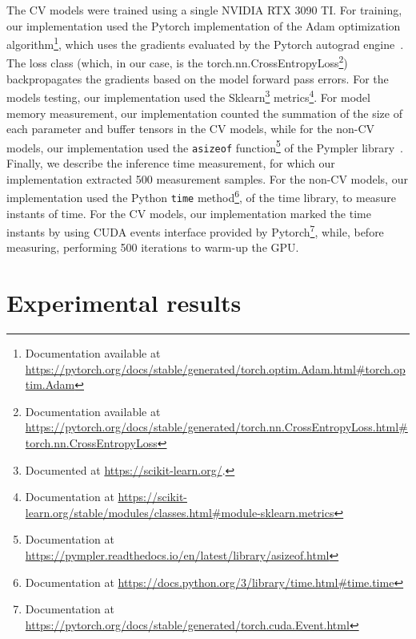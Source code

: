 The \gls{CV} models were trained using a single NVIDIA RTX 3090 TI. For training, our implementation used the Pytorch implementation of the Adam optimization algorithm\footnote{Documentation available at \url{https://pytorch.org/docs/stable/generated/torch.optim.Adam.html\#torch.optim.Adam}}, which uses the gradients evaluated by the Pytorch autograd engine~\cite{Pytorch}. The loss class (which, in our case, is the torch.nn.CrossEntropyLoss\footnote{Documentation available at \url{https://pytorch.org/docs/stable/generated/torch.nn.CrossEntropyLoss.html\#torch.nn.CrossEntropyLoss}}) backpropagates the gradients based on the model forward pass errors. For the models testing, our implementation used the Sklearn\footnote{Documented at \url{https://scikit-learn.org/}.} metrics\footnote{Documentation at \url{https://scikit-learn.org/stable/modules/classes.html\#module-sklearn.metrics}}. For model memory measurement, our implementation counted the summation of the size of each parameter and buffer tensors in the \gls{CV} models, while for the non-\gls{CV} models, our implementation used the \texttt{asizeof} function\footnote{Documentation at \url{https://pympler.readthedocs.io/en/latest/library/asizeof.html}} of the Pympler library~\cite{Pympler}. Finally, we describe the inference time measurement, for which our implementation extracted 500 measurement samples. For the non-\gls{CV} models, our implementation used the Python \texttt{time} method\footnote{Documentation at \url{https://docs.python.org/3/library/time.html\#time.time}}, of the time library, to measure instants of time. For the \gls{CV} models, our implementation marked the time instants by using CUDA events interface provided by Pytorch\footnote{Documentation at \url{https://pytorch.org/docs/stable/generated/torch.cuda.Event.html}}, while, before measuring, performing 500 iterations to warm-up the GPU. 

\section{Experimental results}

